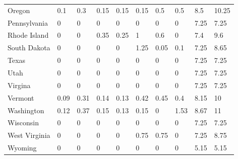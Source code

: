 \begin{table}[H]
{{\begin{tabular}{@{}llllllllll@{}}
                Oregon         & 0.1  & 0.3  & 0.15  & 0.15 & 0.15 & 0.5  & 0.5  & 8.5      & 10.25  \\
                Pennsylvania   & 0    & 0    & 0     & 0    & 0    & 0    & 0    & 7.25     & 7.25   \\
                Rhode Island   & 0    & 0    & 0.35  & 0.25 & 1    & 0.6  & 0    & 7.4      & 9.6    \\
                South Dakota   & 0    & 0    & 0     & 0    & 1.25 & 0.05 & 0.1  & 7.25     & 8.65   \\
                Texas          & 0    & 0    & 0     & 0    & 0    & 0    & 0    & 7.25     & 7.25   \\
                Utah           & 0    & 0    & 0     & 0    & 0    & 0    & 0    & 7.25     & 7.25   \\
                Virgina        & 0    & 0    & 0     & 0    & 0    & 0    & 0    & 7.25     & 7.25   \\
                Vermont        & 0.09 & 0.31 & 0.14  & 0.13 & 0.42 & 0.45 & 0.4  & 8.15     & 10     \\
                Washington     & 0.12 & 0.37 & 0.15  & 0.13 & 0.15 & 0    & 1.53 & 8.67     & 11     \\
                Wisconsin      & 0    & 0    & 0     & 0    & 0    & 0    & 0    & 7.25     & 7.25   \\
                West Virginia  & 0    & 0    & 0     & 0    & 0.75 & 0.75 & 0    & 7.25     & 8.75   \\
                Wyoming        & 0    & 0    & 0     & 0    & 0    & 0    & 0    & 5.15     & 5.15   \\ \bottomrule\bottomrule
            \end{tabular}%
        }
    }

\end{table}